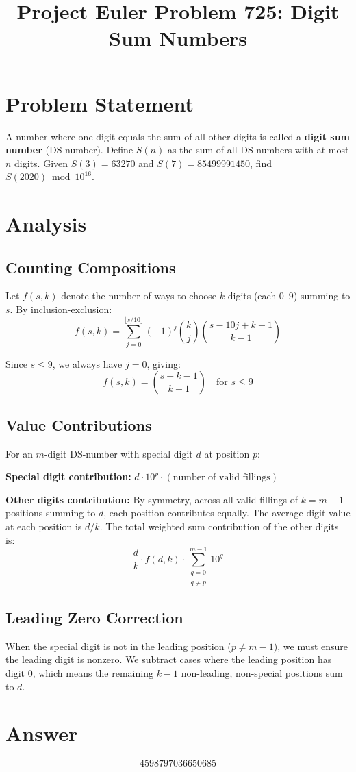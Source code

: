 \documentclass[12pt]{article}
\title{Project Euler Problem 725: Digit Sum Numbers}
\author{}
\date{}
\begin{document}
\maketitle

\section{Problem Statement}

A number where one digit equals the sum of all other digits is called a \textbf{digit sum number} (DS-number). Define $S(n)$ as the sum of all DS-numbers with at most $n$ digits. Given $S(3) = 63270$ and $S(7) = 85499991450$, find $S(2020) \bmod 10^{16}$.

\section{Analysis}

\subsection{Counting Compositions}

Let $f(s, k)$ denote the number of ways to choose $k$ digits (each $0$--$9$) summing to $s$. By inclusion-exclusion:
\[
f(s, k) = \sum_{j=0}^{\lfloor s/10 \rfloor} (-1)^j \binom{k}{j} \binom{s - 10j + k - 1}{k - 1}
\]

Since $s \le 9$, we always have $j = 0$, giving:
\[
f(s, k) = \binom{s + k - 1}{k - 1} \quad \text{for } s \le 9
\]

\subsection{Value Contributions}

For an $m$-digit DS-number with special digit $d$ at position $p$:

\textbf{Special digit contribution:} $d \cdot 10^p \cdot (\text{number of valid fillings})$

\textbf{Other digits contribution:} By symmetry, across all valid fillings of $k = m-1$ positions summing to $d$, each position contributes equally. The average digit value at each position is $d/k$. The total weighted sum contribution of the other digits is:
\[
\frac{d}{k} \cdot f(d, k) \cdot \sum_{\substack{q=0 \\ q \neq p}}^{m-1} 10^q
\]

\subsection{Leading Zero Correction}

When the special digit is not in the leading position ($p \neq m-1$), we must ensure the leading digit is nonzero. We subtract cases where the leading position has digit 0, which means the remaining $k-1$ non-leading, non-special positions sum to $d$.

\section{Answer}

\[
\boxed{4598797036650685}
\]
\end{document}
